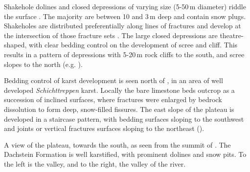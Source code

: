 Shakehole dolines and closed depressions of varying size (5-50\,m diameter) riddle the  surface . The majority are between 10 and 3\,m deep and contain snow plugs. Shakeholes are distributed preferentially along lines of fractures and develop at the intersection of those fracture sets . The large closed depressions are theatre-shaped, with clear bedding control on the development of scree and cliff. This results in a pattern of depressions with 5-20\,m rock cliffs to the south, and scree slopes to the north (e.g. ).

Bedding control of karst development is seen north of , in an area of well developed \emph{Schichttreppen}  karst. Locally the bare limestone beds outcrop as a succession of inclined surfaces, where fractures were enlarged by bedrock dissolution to form deep, snow-filled fissures. The east slope of the  plateau is developed in a staircase pattern, with bedding surfaces sloping to the southwest and joints or vertical fractures surfaces sloping to the northeast ().

\begin{pagefigure}
\checkoddpage \ifoddpage \forcerectofloat \else \forceversofloat \fi
{}
\caption{ A view of the  plateau, towards the south, as seen from the summit of .  The Dachstein Formation is well karstified, with prominent dolines and snow pits. To the left is the  valley, and to the right, the valley of the  river. }
\label{fig:karstic_landscape}
\end{pagefigure}

